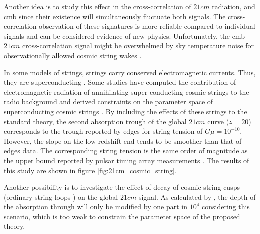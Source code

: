 \documentclass[12pt, TexShade, letterpaper]{report}
\begin{document}
Another idea is to study this effect in the cross-correlation of $21cm$ radiation, and \gls{cmb} since their existence will simultaneously fluctuate both signals. The cross-correlation observation of these signatures is more reliable compared to individual signals and can be considered evidence of new physics. Unfortunately, the \gls{cmb}-$21cm$ cross-correlation signal might be overwhelmed by sky temperature noise for observationally allowed cosmic string wakes \cite{corre_21cm_cmb}.

In some models of strings, strings carry conserved electromagnetic currents. Thus, they are superconducting \cite{constrain_superconduct}. Some studies have computed the contribution of electromagnetic radiation of annihilating super-conducting cosmic strings to the radio background and derived constraints on the parameter space of superconducting cosmic strings \cite{constrain_superconduct, constrain_spectral_bryce, massive_BH}. By including the effects of these strings to the standard theory, the second absorption trough of the global $21cm$ curve ($z=20$) corresponds to the trough reported by \gls{edges} for string tension of $G\mu = 10 ^{-10}$. However, the slope on the low redshift end tends to be smoother than that of \gls{edges} data. The corresponding string tension is the same order of magnitude as the upper bound reported by pulsar timing array measurements \cite{cosmic_string_jordan_robert, pulsar_timing}. The results of this study are shown in figure \ref{fig:21cm_cosmic_string}.\par
Another possibility is to investigate the effect of decay of cosmic string cusps (ordinary string loops \cite{massive_BH}) on the global $21cm$ signal. As calculated by \cite{robert_cusps}, the depth of the absorption through will only be modified by one part in $10^4$ considering this scenario, which is too weak to constrain the parameter space of the proposed theory.\par
\end{document}
